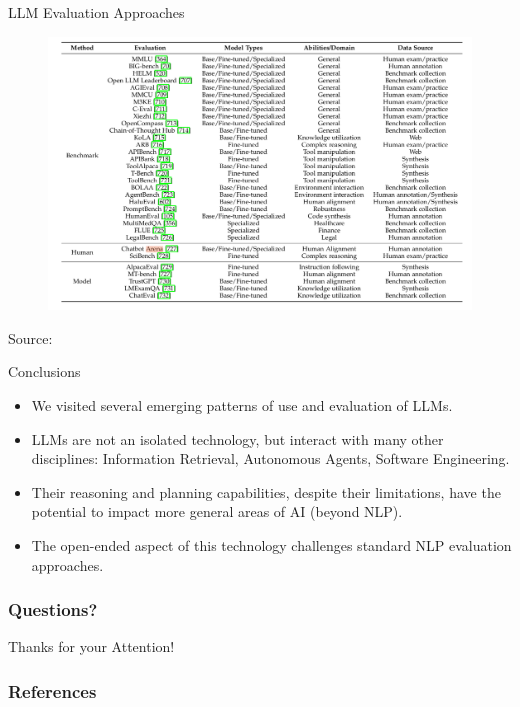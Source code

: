 \documentclass[handout]{beamer}
\begin{document}
\begin{frame}{LLM Evaluation Approaches}
\tiny
      \begin{figure}[h]
       	\includegraphics[scale = 0.23]{pics/LLMbenchmarks.png}
      \end{figure}

Source: \cite{zhao2023survey}
\end{frame}



\begin{frame}{Conclusions}
\begin{scriptsize}
\begin{itemize}
 \item We visited several emerging patterns of use and evaluation of LLMs.
 \item LLMs are not an isolated technology, but interact with many other disciplines: Information Retrieval, Autonomous Agents, Software Engineering.
 \item Their reasoning and planning capabilities, despite their limitations, have the potential to impact more general areas of AI (beyond NLP).
 \item The open-ended aspect of this technology challenges standard NLP evaluation approaches.
\end{itemize}
\end{scriptsize}
\end{frame}

\begin{frame}
\frametitle{Questions?}
\begin{center}\LARGE Thanks for your Attention!\\ \end{center}



\end{frame}

\begin{frame}[allowframebreaks]\scriptsize
\frametitle{References}


%
\end{frame}  


\end{document}
